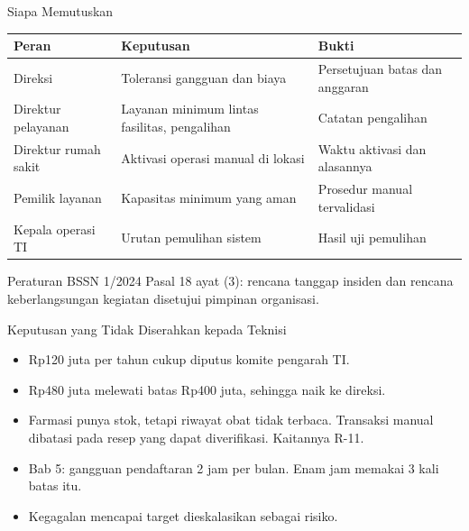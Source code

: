 \documentclass[aspectratio=169, table, 12pt]{beamer}
\begin{document}
\begin{frame}{{\Large Siapa Memutuskan}}
  \vspace{4pt}
  \footnotesize
  \begin{tabularx}{\textwidth}{|>{\raggedright\arraybackslash}p{}|>{\raggedright\arraybackslash}X|>{\raggedright\arraybackslash}X|}
    \hline
    \textbf{Peran} & \textbf{Keputusan} & \textbf{Bukti} \\ \hline
    Direksi & Toleransi gangguan dan biaya & Persetujuan batas dan anggaran \\ \hline
    Direktur pelayanan & Layanan minimum lintas fasilitas, pengalihan & Catatan pengalihan \\ \hline
    Direktur rumah sakit & Aktivasi operasi manual di lokasi & Waktu aktivasi dan alasannya \\
    \hline
    Pemilik layanan & Kapasitas minimum yang aman & Prosedur manual tervalidasi \\ \hline
    Kepala operasi TI & Urutan pemulihan sistem & Hasil uji pemulihan \\ \hline
  \end{tabularx}

  \vspace{8pt}
  \small Peraturan BSSN 1/2024 Pasal 18 ayat (3): rencana tanggap insiden dan rencana
  keberlangsungan kegiatan disetujui pimpinan organisasi.
\end{frame}

\begin{frame}{{\Large Keputusan yang Tidak Diserahkan kepada Teknisi}}
  \vspace{6pt}
  \small
  \begin{itemize}
    \item Rp120 juta per tahun cukup diputus komite pengarah TI.
    \item Rp480 juta melewati batas Rp400 juta, sehingga naik ke direksi.
    \item Farmasi punya stok, tetapi riwayat obat tidak terbaca. Transaksi manual dibatasi pada
          resep yang dapat diverifikasi. Kaitannya R-11.
    \item Bab 5: gangguan pendaftaran 2 jam per bulan. Enam jam memakai 3 kali batas itu.
    \item Kegagalan mencapai target dieskalasikan sebagai risiko.
  \end{itemize}
\end{frame}
\end{document}
